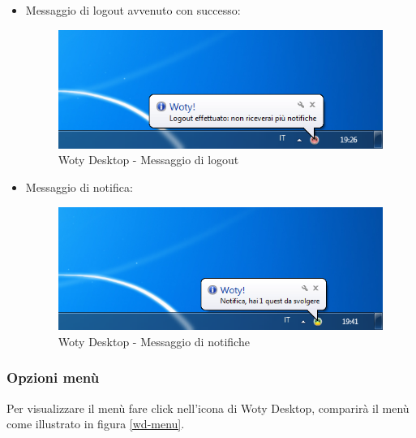 \begin{itemize}
\item Messaggio di logout avvenuto con successo: 

\begin{center}
\begin{figure}[H]
\centering
\includegraphics[scale=0.6]{images/wotyDesktop/schreenshots/msg-logout.png}
\caption{Woty Desktop - Messaggio di logout}
\label{wd}
\end{figure}
\end{center}


\item Messaggio di notifica: 

\begin{center}
\begin{figure}[H]
\centering
\includegraphics[scale=0.6]{images/wotyDesktop/schreenshots/msg-notify.png}
\caption{Woty Desktop - Messaggio di notifiche}
\label{wd}
\end{figure}
\end{center}

\end{itemize}


\subsubsection{Opzioni menù}
Per visualizzare il menù fare click nell'icona di Woty Desktop, comparirà il menù come illustrato in figura \ref{wd-menu}.

